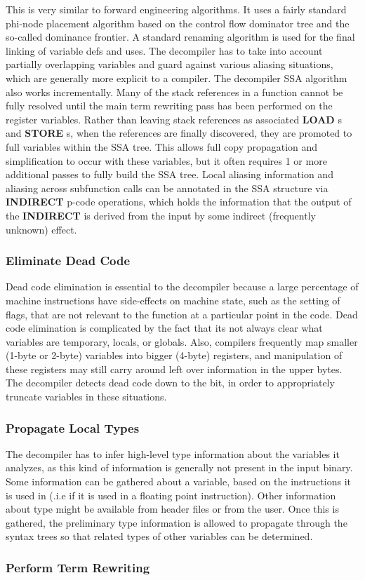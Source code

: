 This is very similar to forward engineering algorithms. It uses a fairly standard phi-\/node placement algorithm based on the control flow dominator tree and the so-\/called dominance frontier. A standard renaming algorithm is used for the final linking of variable defs and uses. The decompiler has to take into account partially overlapping variables and guard against various aliasing situations, which are generally more explicit to a compiler. The decompiler S\+SA algorithm also works incrementally. Many of the stack references in a function cannot be fully resolved until the main term rewriting pass has been performed on the register variables. Rather than leaving stack references as associated {\bfseries{L\+O\+AD}} s and {\bfseries{S\+T\+O\+RE}} s, when the references are finally discovered, they are promoted to full variables within the S\+SA tree. This allows full copy propagation and simplification to occur with these variables, but it often requires 1 or more additional passes to fully build the S\+SA tree. Local aliasing information and aliasing across subfunction calls can be annotated in the S\+SA structure via {\bfseries{I\+N\+D\+I\+R\+E\+CT}} p-\/code operations, which holds the information that the output of the {\bfseries{I\+N\+D\+I\+R\+E\+CT}} is derived from the input by some indirect (frequently unknown) effect.\hypertarget{index_step5b}{}\subsubsection{Eliminate Dead Code}\label{index_step5b}
Dead code elimination is essential to the decompiler because a large percentage of machine instructions have side-\/effects on machine state, such as the setting of flags, that are not relevant to the function at a particular point in the code. Dead code elimination is complicated by the fact that its not always clear what variables are temporary, locals, or globals. Also, compilers frequently map smaller (1-\/byte or 2-\/byte) variables into bigger (4-\/byte) registers, and manipulation of these registers may still carry around left over information in the upper bytes. The decompiler detects dead code down to the bit, in order to appropriately truncate variables in these situations.\hypertarget{index_step5c}{}\subsubsection{Propagate Local Types}\label{index_step5c}
The decompiler has to infer high-\/level type information about the variables it analyzes, as this kind of information is generally not present in the input binary. Some information can be gathered about a variable, based on the instructions it is used in (.i.\+e if it is used in a floating point instruction). Other information about type might be available from header files or from the user. Once this is gathered, the preliminary type information is allowed to propagate through the syntax trees so that related types of other variables can be determined.\hypertarget{index_step5d}{}\subsubsection{Perform Term Rewriting}\label{index_step5d}
